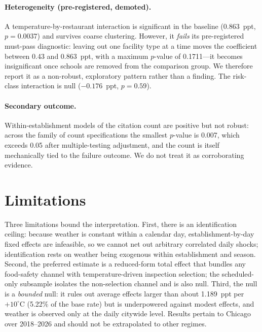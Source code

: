 \documentclass[11pt]{article}
\begin{document}
\begin{table}[H]\centering
\caption{Robustness of the temperature coefficient across specifications}
\label{tab:robust}

\end{table}

\begin{table}[H]\centering
\caption{Inference, contested subsamples, secondary outcome, and heterogeneity}
\label{tab:inference}

\end{table}

\paragraph{Heterogeneity (pre-registered, demoted).}
A temperature-by-restaurant interaction is significant in the baseline (0.863~ppt,
$p=0.0037$) and survives coarse clustering. However, it \emph{fails} its pre-registered
must-pass diagnostic: leaving out one facility type at a time moves the coefficient between
0.43 and 0.863~ppt, with a maximum $p$-value of 0.1711---it becomes insignificant once
schools are removed from the comparison group. We therefore report it as a non-robust,
exploratory pattern rather than a finding. The risk-class interaction is null ($-0.176$~ppt,
$p=0.59$).

\paragraph{Secondary outcome.}
Within-establishment models of the citation count are positive but not robust: across the
family of count specifications the smallest $p$-value is 0.007, which exceeds 0.05 after
multiple-testing adjustment, and the count is itself mechanically tied to the failure
outcome. We do not treat it as corroborating evidence.

\section{Limitations}
Three limitations bound the interpretation. First, there is an identification ceiling:
because weather is constant within a calendar day, establishment-by-day fixed effects are
infeasible, so we cannot net out arbitrary correlated daily shocks; identification rests on
weather being exogenous within establishment and season. Second, the preferred estimate is a
reduced-form total effect that bundles any food-safety channel with temperature-driven
inspection selection; the scheduled-only subsample isolates the non-selection channel and is
also null. Third, the null is a \emph{bounded} null: it rules out average effects larger than
about 1.189~ppt per $+10^\circ$C (5.22\% of the base rate) but is underpowered against
modest effects, and weather is observed only at the daily citywide level. Results pertain to
Chicago over 2018--2026 and should not be extrapolated to other regimes.
\end{document}
